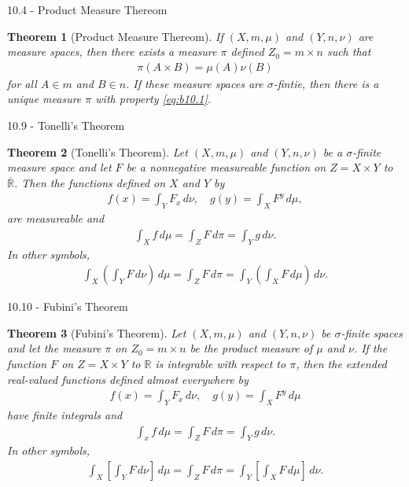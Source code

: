 \documentclass{article}
\newtheorem{theorem}{Theorem}[section]
\numberwithin{equation}{section}
\begin{document}
10.4 - Product Measure Thereom

\begin{theorem}[Product Measure Thereom]
    If $(X, m, \mu)$ and $(Y, n, \nu)$ are measure spaces, then there exists a measure $\pi$ defined $Z_0 = m \times n$ such that
    \begin{align}\label{eq:b10.1}
        \pi(A \times B) = \mu(A)\nu(B)
    \end{align}
    for all $A \in m$ and $B \in n$.
    If these measure spaces are $\sigma$-fintie, then there is a unique measure $\pi$ with property \eqref{eq:b10.1}.
\end{theorem}

10.9 - Tonelli's Theorem

\begin{theorem}[Tonelli's Theorem]
    Let $(X, m, \mu)$ and $(Y, n, \nu)$ be a $\sigma$-finite measure space and let $F$ be a nonnegative measureable function on $Z = X \times Y$ to $\overline{\mathbb{R}}$.
    Then the functions defined on $X$ and $Y$ by
    \begin{align}\label{eq:b10.4}
        f(x) = \int_Y F_x \, d\nu, \quad
        g(y) = \int_X F^y \, d\mu,
    \end{align}
    are measureable and
    \begin{align}\label{eq:b10.5}
        \int_X f \, d\mu = \int_Z F \, d\pi = \int_Y g \, d\nu.
    \end{align}
    In other symbols,
    \begin{align}\label{eq:b10.6}
        \int_X\left(\int_Y F \, d\nu \right) \, d\mu =
        \int_Z F \, d\pi =
        \int_Y\left(\int_X F \, d\mu \right) \, d\nu.
    \end{align}
\end{theorem}

10.10 - Fubini's Theorem

\begin{theorem}[Fubini's Theorem]
    Let $(X, m, \mu)$ and $(Y, n, \nu)$ be $\sigma$-finite spaces and let the measure $\pi$ on $Z_0 = m \times n$ be the product measure of $\mu$ and $\nu$.
    If the function $F$ on $Z = X \times Y$ to $\mathbb{R}$ is integrable with respect to $\pi$, then the extended real-valued functions defined almost everywhere by
    \begin{align}\label{eq:b10.8}
        f(x) = \int_Y F_x \, d\nu, \quad
        g(y) = \int_X F^y \, d\mu
    \end{align}
    have finite integrals and
    \begin{align}\label{eq:b10.9}
        \int_x f \, d\mu = \int_Z F \, d\pi = \int_Y g \, d\nu. 
    \end{align}
    In other symbols,
    \begin{align}\label{eq:b10.10}
        \int_X \left[\int_Y F \, d\nu\right] \, d\mu =
        \int_Z F \, d\pi =
        \int_Y \left[\int_X F \, d\mu\right] \, d\nu.
    \end{align}
\end{theorem}
\end{document}
